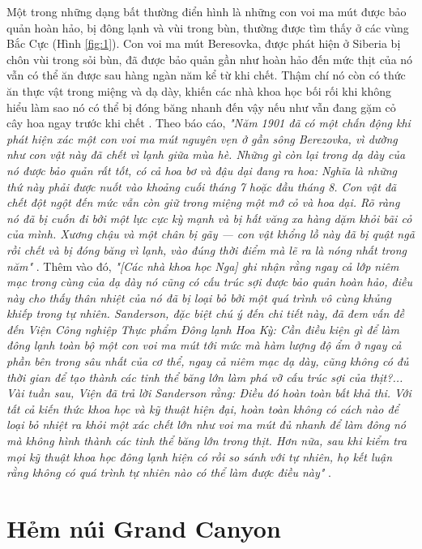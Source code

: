 \documentclass[10pt,twocolumn,letterpaper]{article}
\begin{document}
Một trong những dạng bất thường điển hình là những con voi ma mút được bảo quản hoàn hảo, bị đông lạnh và vùi trong bùn, thường được tìm thấy ở các vùng Bắc Cực (Hình \ref{fig:1}). Con voi ma mút Beresovka, được phát hiện ở Siberia bị chôn vùi trong sỏi bùn, đã được bảo quản gần như hoàn hảo đến mức thịt của nó vẫn có thể ăn được sau hàng ngàn năm kể từ khi chết. Thậm chí nó còn có thức ăn thực vật trong miệng và dạ dày, khiến các nhà khoa học bối rối khi không hiểu làm sao nó có thể bị đóng băng nhanh đến vậy nếu như vẫn đang gặm cỏ cây hoa ngay trước khi chết \cite{17}. Theo báo cáo, \textit{"Năm 1901 đã có một chấn động khi phát hiện xác một con voi ma mút nguyên vẹn ở gần sông Berezovka, vì dường như con vật này đã chết vì lạnh giữa mùa hè. Những gì còn lại trong dạ dày của nó được bảo quản rất tốt, có cả hoa bơ và đậu dại đang ra hoa: Nghĩa là những thứ này phải được nuốt vào khoảng cuối tháng 7 hoặc đầu tháng 8. Con vật đã chết đột ngột đến mức vẫn còn giữ trong miệng một mớ cỏ và hoa dại. Rõ ràng nó đã bị cuốn đi bởi một lực cực kỳ mạnh và bị hất văng xa hàng dặm khỏi bãi cỏ của mình. Xương chậu và một chân bị gãy — con vật khổng lồ này đã bị quật ngã rồi chết và bị đóng băng vì lạnh, vào đúng thời điểm mà lẽ ra là nóng nhất trong năm"} \cite{18}. Thêm vào đó, \textit{"[Các nhà khoa học Nga] ghi nhận rằng ngay cả lớp niêm mạc trong cùng của dạ dày nó cũng có cấu trúc sợi được bảo quản hoàn hảo, điều này cho thấy thân nhiệt của nó đã bị loại bỏ bởi một quá trình vô cùng khủng khiếp trong tự nhiên. Sanderson, đặc biệt chú ý đến chi tiết này, đã đem vấn đề đến Viện Công nghiệp Thực phẩm Đông lạnh Hoa Kỳ: Cần điều kiện gì để làm đông lạnh toàn bộ một con voi ma mút tới mức mà hàm lượng độ ẩm ở ngay cả phần bên trong sâu nhất của cơ thể, ngay cả niêm mạc dạ dày, cũng không có đủ thời gian để tạo thành các tinh thể băng lớn làm phá vỡ cấu trúc sợi của thịt?... Vài tuần sau, Viện đã trả lời Sanderson rằng: Điều đó hoàn toàn bất khả thi. Với tất cả kiến thức khoa học và kỹ thuật hiện đại, hoàn toàn không có cách nào để loại bỏ nhiệt ra khỏi một xác chết lớn như voi ma mút đủ nhanh để làm đông nó mà không hình thành các tinh thể băng lớn trong thịt. Hơn nữa, sau khi kiểm tra mọi kỹ thuật khoa học đông lạnh hiện có rồi so sánh với tự nhiên, họ kết luận rằng không có quá trình tự nhiên nào có thể làm được điều này"} \cite{19}.

\section{Hẻm núi Grand Canyon}
\end{document}
